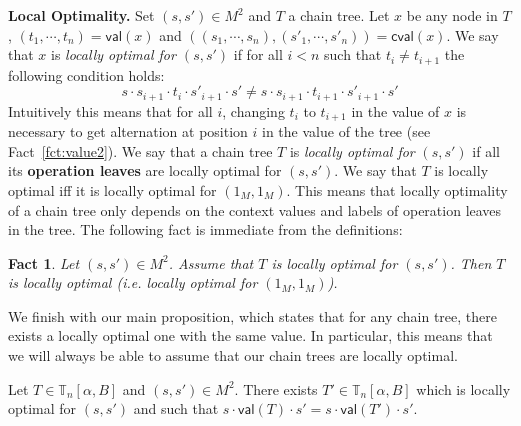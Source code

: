 \documentclass[envcountsame]{llncs}
\newcommand\ct{\ensuremath{\mathbb{T}}\xspace}
\newcommand\val[1]{\ensuremath{\textsf{val}(#1)\xspace}}
\newcommand\cval[1]{\ensuremath{\textsf{cval}(#1)\xspace}}
\newcommand\chain{chain\xspace}
\newtheorem{fact}[theorem]{Fact}
\begin{document}
\medskip
\noindent
{\bf Local Optimality.} Set $(s,s') \in M^2$ and $T$ a \chain
tree. Let $x$ be any node in $T$, $(t_1,\cdots,t_{n}) = \val{x}$
and $((s_1,\cdots,s_{n}),(s'_1,\cdots,s'_{n})) = \cval{x}$. We say
that $x$ is \emph{locally optimal for $(s,s')$} if for all $i < n$
such that $t_i \neq t_{i+1}$ the following condition holds:
\[
s \cdot s_{i+1} \cdot t_{i} \cdot s'_{i+1} \cdot s' \neq s \cdot
s_{i+1} \cdot t_{i+1} \cdot s'_{i+1} \cdot s'
\]
Intuitively this means that for all $i$, changing $t_i$ to $t_{i+1}$
in the value of $x$ is necessary to get alternation at position $i$
in the value of the tree (see Fact~\ref{fct:value2}). We say that a
\chain tree $T$ is \emph{locally optimal for} $(s,s')$ if all its
{\bf operation leaves} are locally optimal for $(s,s')$. We say that
$T$ is locally optimal iff it is locally optimal for $(1_M,1_M)$.
This means that locally optimality of a \chain tree only depends on
the context values and labels of operation leaves in the tree. The
following fact is immediate from the definitions:

\begin{fact} \label{fct:optimal}
  Let $(s,s')\in M^2$. Assume that $T$ is locally optimal for
  $(s,s')$. Then $T$ is locally optimal (i.e. locally optimal for
  $(1_M,1_M)$). 
\end{fact}

We finish with our main proposition, which states that for any \chain tree,
there exists a locally optimal one with the same value. In particular,
this means that we will always be able to assume that our \chain trees
are locally optimal.

\begin{proposition} \label{prop:optimal}
  Let $T \in \ct_n[\alpha,B]$ and $(s,s') \in M^2$. There exists $T' \in
  \ct_n[\alpha,B]$ which is locally optimal for $(s,s')$ and such that
  $s \cdot \val{T} \cdot s' = s \cdot \val{T'} \cdot s'$.
\end{proposition}
\end{document}
